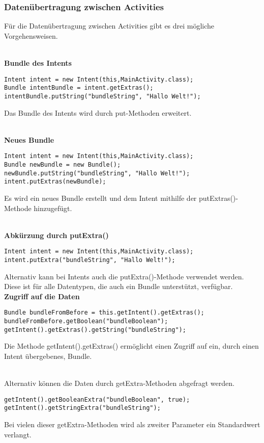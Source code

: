 \documentclass[FIPLY_base.tex]{subfiles}
\begin{document}
\subsubsection{Datenübertragung zwischen Activities}
Für die Datenübertragung zwischen Activities gibt es drei mögliche Vorgehensweisen.

\ \\
\textbf{Bundle des Intents}
\begin{lstlisting}[caption={Übertragung durch das Bundle des Intents},label=DescriptiveLabel]
Intent intent = new Intent(this,MainActivity.class);
Bundle intentBundle = intent.getExtras();
intentBundle.putString("bundleString", "Hallo Welt!");
\end{lstlisting} 
Das Bundle des Intents wird durch put-Methoden erweitert.

\ \\
\textbf{Neues Bundle}
\begin{lstlisting}[caption={Übertragung durch einen Intent mit einem neuen Bundle},label=DescriptiveLabel]
Intent intent = new Intent(this,MainActivity.class);
Bundle newBundle = new Bundle();
newBundle.putString("bundleString", "Hallo Welt!");
intent.putExtras(newBundle);
\end{lstlisting}
Es wird ein neues Bundle erstellt und dem Intent mithilfe der putExtras()-Methode hinzugefügt.

\newpage
\ \\
\textbf{Abkürzung durch putExtra()}
\begin{lstlisting}[caption={Abkürzung durch die putExtra()-Methode eines Intents},label=DescriptiveLabel]
Intent intent = new Intent(this,MainActivity.class);
intent.putExtra("bundleString", "Hallo Welt!");
\end{lstlisting} 
Alternativ kann bei Intents auch die putExtra()-Methode verwendet werden. Diese ist für alle Datentypen, die auch ein Bundle unterstützt, verfügbar.
\ \\
\textbf{Zugriff auf die Daten}
\begin{lstlisting}[caption={Zugriff auf die Daten in der neuen Activity durch die getExtras()-Methode},label=DescriptiveLabel]
Bundle bundleFromBefore = this.getIntent().getExtras();
bundleFromBefore.getBoolean("bundleBoolean");
getIntent().getExtras().getString("bundleString");
\end{lstlisting}
Die Methode getIntent().getExtras() ermöglicht einen Zugriff auf ein, durch einen Intent übergebenes, Bundle.

\ \\
Alternativ können die Daten durch getExtra-Methoden abgefragt werden.
\begin{lstlisting}[caption={Zugriff auf die Daten in der neuen Activity durch getExtra()-Methoden},label=DescriptiveLabel]
getIntent().getBooleanExtra("bundleBoolean", true);
getIntent().getStringExtra("bundleString");
\end{lstlisting}
Bei vielen dieser getExtra-Methoden wird als zweiter Parameter ein Standardwert verlangt.
\end{document}
